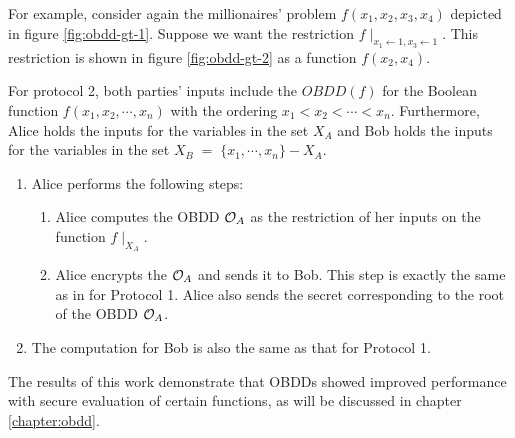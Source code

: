 For example, consider again the millionaires' problem $f(x_1,x_2,x_3,x_4)$ depicted in 
figure \ref{fig:obdd-gt-1}.
Suppose we want the restriction $f\mid_{x_1\leftarrow 1,x_3\leftarrow 1}$.  This restriction is
shown in figure \ref{fig:obdd-gt-2} as a function $f(x_2,x_4)$.

\begin{flushleft}
For protocol 2, both parties' inputs include the $OBDD(f)$ for the
Boolean function $f(x_{1},x_{2},\cdots,x_{n})$ with the ordering
$x_{1}<x_{2}<\cdots<x_{n}$. Furthermore, Alice holds the inputs for
the variables in the set $X_{A}$ and Bob holds the inputs for the
variables in the set $X_{B}\;=\;\{x_{1},\cdots,x_{n}\}-X_{A}$. 
\par\end{flushleft}
\begin{enumerate}
\item Alice performs the following steps:

\begin{enumerate}
\item Alice computes the OBDD ${\cal O}_{A}$ as the restriction of her
inputs on the function $f\mid_{X_{A}}$. 
\item Alice encrypts the ${\cal O}_{A}$ and sends it to Bob. This step is exactly
the same as in for Protocol 1. Alice also sends the secret corresponding
to the root of the OBDD ${\cal O}_{A}$. 
\end{enumerate}
\item The computation for Bob is also the same as that for Protocol 1. 
\end{enumerate}
The results of this work demonstrate that OBDDs showed improved performance
with secure evaluation of certain functions, as will be discussed
in chapter \ref{chapter:obdd}.

